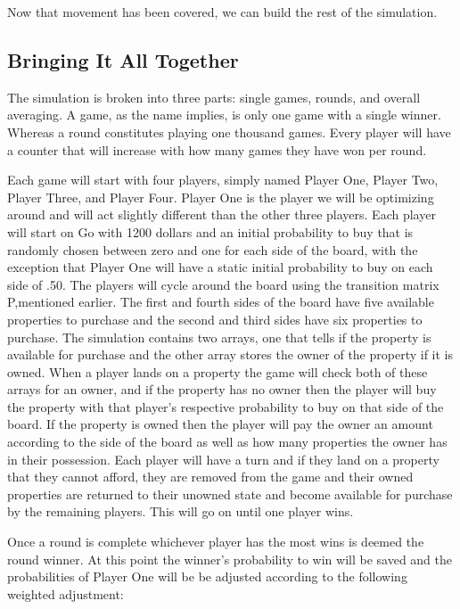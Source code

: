 \documentclass{article}
\begin{document}
Now that movement has been covered, we can build the rest of the simulation.

\subsection{Bringing It All Together}

The simulation is broken into three parts: single games, rounds, and overall averaging.  A game, as the name implies, is only one game with a single winner.  Whereas a round constitutes playing one thousand games.  Every player will have a counter that will increase with how many games they have won per round.

Each game will start with four players, simply named Player One, Player Two, Player Three, and Player Four.  Player One is the player we will be optimizing around and will act slightly different than the other three players.  Each player will start on Go with 1200 dollars and an initial probability to buy that is randomly chosen between zero and one for each side of the board, with the exception that Player One will have a static initial probability to buy on each side of .50.  The players will cycle around the board using the transition matrix P,mentioned earlier.  The first and fourth sides of the board have five available properties to purchase and the second and third sides have six properties to purchase.  The simulation contains two arrays, one that tells if the property is available for purchase and the other array stores the owner of the property if it is owned.  When a player lands on a property the game will check both of these arrays for an owner, and if the property has no owner then the player will buy the property with that player’s respective probability to buy on that side of the board.  If the property is owned then the player will pay the owner an amount according to the side of the board as well as how many properties the owner has in their possession.  Each player will have a turn and if they land on a property that they cannot afford, they are removed from the game and their owned properties are returned to their unowned state and become available for purchase by the remaining players.  This will go on until one player wins.  

Once a round is complete whichever player has the most wins is deemed the round winner.  At this point the winner’s probability to win will be saved and the probabilities of Player One will be be adjusted according to the following weighted adjustment:
\end{document}
